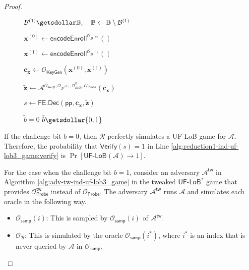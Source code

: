 \begin{proof}
\begin{figure}[h]
\begin{minipage}[t]{0.5\linewidth}
\begin{algorithm}[H]
\begin{algorithmic}[1]
		\State $\mathcal{B}^{(1)} \getsdollar \mathbb{B}, \quad \mathbb{B} \gets \mathbb{B} \setminus \mathcal{B}^{(1)}$

		\State $\mathbf{x}^{(0)} \gets \textsf{encodeEnroll}^{\mathcal{O}_{\mathcal{B}^{(0)}}}()$

		\State $\mathbf{x}^{(1)} \gets \textsf{encodeEnroll}^{\mathcal{O}_{\mathcal{B}^{(1)}}}()$

		\State $\mathbf{c_x} \gets \mathcal{O}_{\textsf{KeyGen}}(\mathbf{x}^{(0)}, \mathbf{x}^{(1)})$

		\State ${\mathbf{\tilde{z}}} \gets \mathcal{A}^{\mathcal{O}_{\textsf{samp}}, \mathcal{O}_{\mathcal{B}^{(0)}}, \mathcal{O}_\textsf{auth}^q, \mathcal{O}_{\textsf{Probe}} } ( \mathbf{c_x})$

		\State $s \gets \textsf{FE.Dec}( \textsf{pp}, \mathbf{c_x}, \mathbf{\tilde{z}} )$

		 \label{alg:reduction1-ind-uf-lob3_game:verify}
			\State \Return $\tilde{b} = 0$
		\Else
			\State \Return $\tilde{b} \getsdollar \{0, 1\}$
		\EndIf

	\end{algorithmic}
	\end{algorithm}
	\end{minipage}
	
\label{fig:reduction1-ind-uf-lob3_game}
\end{figure}

If the challenge bit $b = 0$, then $\mathcal{R}$ perfectly simulates a \textsf{UF-LoB} game for $\mathcal{A}$. Therefore, the probability that $\textsf{Verify}(s) = 1$ in Line \ref{alg:reduction1-ind-uf-lob3_game:verify} is $\Pr[\textsf{UF-LoB}(\mathcal{A}) \to 1]$.

	For the case when the challenge bit $b = 1$, consider an adversary $\mathcal{A}^\textsf{tw}$ in Algorithm \ref{alg:adv-tw-ind-uf-lob3_game} in the tweaked $\textsf{UF-LoB}^*$ game that provides $\mathcal{O}_\textsf{Probe}^\textsf{tw}$ instead of $\mathcal{O}_\textsf{Probe}$. The adversary $\mathcal{A}^\textsf{tw}$ runs $\mathcal{A}$ and simulates each oracle in the following way.

\begin{itemize}
	\item $\mathcal{O}_{\textsf{samp}}(i)$: This is sampled by $\mathcal{O}_{\textsf{samp}}(i)$ of $\mathcal{A}^\textsf{tw}$.
	
	\item $\mathcal{O}_{\mathcal{B}}$: This is simulated by the oracle $\mathcal{O}_{\textsf{samp}}(i^*)$, where $i^*$ is an index that is never queried by $\mathcal{A}$ in $\mathcal{O}_{\textsf{samp}}$.


\end{itemize}
\end{proof}
